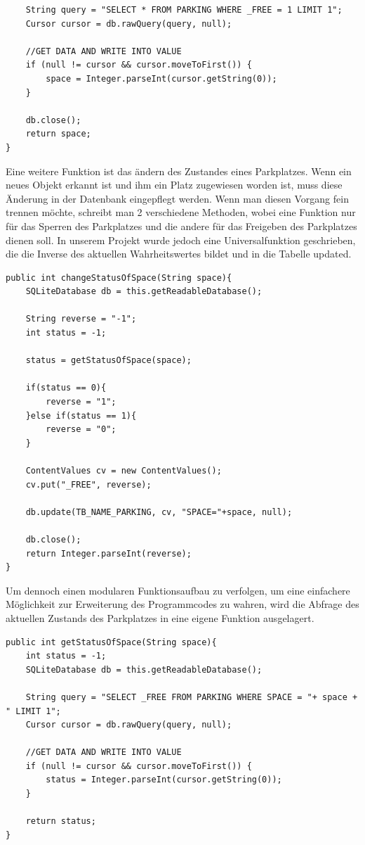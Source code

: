 \documentclass[11pt]{article}
\begin{document}
\begin{onehalfspacing}
\begin{lstlisting}
	String query = "SELECT * FROM PARKING WHERE _FREE = 1 LIMIT 1";
	Cursor cursor = db.rawQuery(query, null);
	
	//GET DATA AND WRITE INTO VALUE
	if (null != cursor && cursor.moveToFirst()) {
	    space = Integer.parseInt(cursor.getString(0));
	}
	
	db.close();
	return space;
}
\end{lstlisting}
Eine weitere Funktion ist das ändern des Zustandes eines Parkplatzes. Wenn ein
neues Objekt erkannt ist und ihm ein Platz zugewiesen worden ist, muss diese
Änderung in der Datenbank eingepflegt werden. Wenn man diesen Vorgang fein
trennen möchte, schreibt man 2 verschiedene Methoden, wobei eine Funktion nur
für das Sperren des Parkplatzes und die andere für das Freigeben des Parkplatzes
dienen soll. In unserem Projekt wurde jedoch eine Universalfunktion geschrieben,
die die Inverse des aktuellen Wahrheitswertes bildet und in die Tabelle updated.
\begin{lstlisting}
public int changeStatusOfSpace(String space){
	SQLiteDatabase db = this.getReadableDatabase();
	
	String reverse = "-1";
	int status = -1;
	
	status = getStatusOfSpace(space);
	
	if(status == 0){
		reverse = "1";
	}else if(status == 1){
		reverse = "0";
	}
	
	ContentValues cv = new ContentValues();
	cv.put("_FREE", reverse); 
	
	db.update(TB_NAME_PARKING, cv, "SPACE="+space, null);
	
	db.close();
	return Integer.parseInt(reverse);
}
\end{lstlisting} 
Um dennoch einen modularen Funktionsaufbau zu verfolgen, um eine
einfachere Möglichkeit zur Erweiterung des Programmcodes zu wahren, wird die
Abfrage des aktuellen Zustands des Parkplatzes in eine eigene Funktion
ausgelagert.
\begin{lstlisting}
public int getStatusOfSpace(String space){
	int status = -1;
	SQLiteDatabase db = this.getReadableDatabase();
	
	String query = "SELECT _FREE FROM PARKING WHERE SPACE = "+ space + " LIMIT 1";
	Cursor cursor = db.rawQuery(query, null);
	
	//GET DATA AND WRITE INTO VALUE
	if (null != cursor && cursor.moveToFirst()) {
	    status = Integer.parseInt(cursor.getString(0));
	}
	
	return status;
}
\end{lstlisting}

\end{onehalfspacing}
\end{document}

